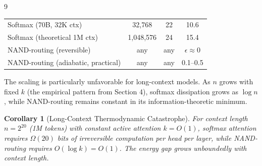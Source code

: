 \documentclass[11pt]{article}
\newtheorem{corollary}[theorem]{Corollary}
\theoremstyle{definition}
\begin{document}
\begin{thebibliography}{9}
{{{\begin{table}[h]
\begin{tabular}{lccc}
Softmax (70B, 32K ctx) & 32,768 & 22 & 10.6 \\






Softmax (theoretical 1M ctx) & 1,048,576 & 24 & 15.4 \\






\midrule






NAND-routing (reversible) & any & any & $\epsilon \approx 0$ \\






NAND-routing (adiabatic, practical) & any & any & 0.1--0.5 \\






\bottomrule






\end{tabular}






\end{table}













The scaling is particularly unfavorable for long-context models. As $n$ grows with fixed $k$ (the empirical pattern from Section 4), softmax dissipation grows as $\log n$, while NAND-routing remains constant in its information-theoretic minimum.













\begin{corollary}[Long-Context Thermodynamic Catastrophe]






For context length $n = 2^{20}$ (1M tokens) with constant active attention $k = O(1)$, softmax attention requires $\Omega(20)$ bits of irreversible computation per head per layer, while NAND-routing requires $O(\log k) = O(1)$. The energy gap grows unboundedly with context length.







\end{corollary}}}}
\end{thebibliography}
\end{document}
